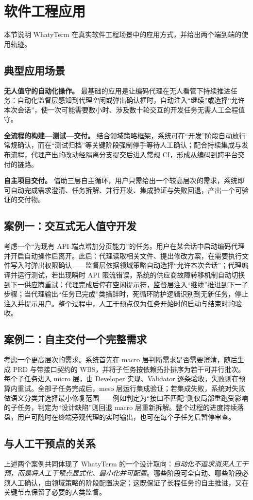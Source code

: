 \section{软件工程应用}
\label{sec:app}

本节说明 WhatyTerm 在真实软件工程场景中的应用方式，并给出两个端到端的使用轨迹。

\subsection{典型应用场景}

\textbf{无人值守的自动化操作。} 最基础的应用是让编码代理在无人看管下持续推进任务：自动化监督层感知到代理空闲或弹出确认框时，自动注入“继续”或选择“允许本次会话”，使一次可能需要数小时、涉及数十轮交互的开发任务无需人工全程值守。

\textbf{全流程的构建—测试—交付。} 结合领域策略框架，系统可在“开发”阶段自动放行常规确认，而在“测试归档”等关键阶段强制停手等待人工确认；配合持续集成与发布流程，代理产出的改动经隔离分支提交后进入常规 CI，形成从编码到跨平台交付的链路。

\textbf{自主项目交付。} 借助三层自主循环，用户只需给出一个较高层次的需求，系统即可自动完成需求澄清、任务拆解、并行开发、集成验证与失败回退，产出一个可验证的交付物。

\subsection{案例一：交互式无人值守开发}

考虑一个“为现有 API 端点增加分页能力”的任务。用户在某会话中启动编码代理并开启自动操作后离开。此后：代理读取相关文件、提出修改方案，在需要执行文件写入时弹出权限确认——监督层依据领域策略自动选择“允许本次会话”；代理编译并运行测试，若出现瞬时 API 限流错误，系统的供应商故障转移机制自动切换到下一供应商重试；代理完成后停在空闲提示符，监督层注入“继续”推进到下一子步骤；当代理输出“任务已完成”类措辞时，死循环防护逻辑识别到无新任务，停止注入并提示用户。整个过程中，人工干预点仅为任务开始时的启动与结束时的验收。

\subsection{案例二：自主交付一个完整需求}

考虑一个更高层次的需求。系统首先在 macro 层判断需求是否需要澄清，随后生成 PRD 与带接口契约的 WBS，并将子任务按依赖拓扑排序为若干可并行批次。每个子任务进入 micro 层，由 Developer 实现、Validator 逐条验收，失败则在预算内重试。全部子任务完成后，meso 层运行集成验证；若集成失败，系统对失败做语义分类并选择最小修复范围——例如判定为“接口不匹配”则仅局部重跑受影响的子任务，判定为“设计缺陷”则回退 macro 层重新拆解。整个过程的进度持续落盘，用户可随时在终端旁观代理的实时输出，也可在每个子任务后暂停审查。

\subsection{与人工干预点的关系}

上述两个案例共同体现了 WhatyTerm 的一个设计取向：\emph{自动化不追求消灭人工干预，而是将人工干预点显式化、最小化并可配置}。哪些阶段可全自动、哪些阶段必须人工确认，由领域策略的阶段配置决定；这既保证了长程任务的自主推进，又在关键节点保留了必要的人类监督。
